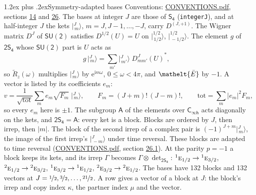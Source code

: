 \documentclass[10pt,a4paper]{article}
\makeatletter
\renewcommand\section{\@startsection{section}{1}{\z@}{-3ex plus -1ex minus -.2ex}%
  {1.2ex plus .2ex}{\normalfont\large\sffamily\bfseries\color{parttitle}}}
\numberwithin{equation}{section}
\newcommand{\eltfont}[1]{{\let\sigma\eltsigma\mathelt{#1}}}
\newcommand{\grp}[1]{\mathsf{#1}}
\newcommand{\irr}[1]{\text{\normalfont\scshape #1}}
\newcommand{\conjpair}[1]{{}^{#1}}
\newcommand{\elt}[1]{\eltfont{#1}}
\newcommand{\iunit}{\mathrm{i}}
\newcommand{\expe}{\mathrm{e}}
\newcommand{\irrJp}[2]{D^{(#1,#2)}}
\newcommand{\wignerD}[1]{D^{#1}}
\newcommand{\conj}[1]{{#1}^{*}}
\newcommand{\irrprod}{\otimes}
\newcommand{\mult}{\kappa}
\newcommand{\intx}{\mu}
\newcommand{\jm}[2]{\bigl\lvert{}^{#1}_{\,#2}\bigr\rangle}
\newcommand{\barred}[1]{\bar{#1}}
\newcommand{\lift}[1]{\tilde{#1}}
\makeatother
\begin{document}
\section{Symmetry-adapted bases}\label{s:bases}
Conventions: \href{../../CONVENTIONS.pdf}{CONVENTIONS.pdf}, sections \href{../../../rotation/CONVENTIONS.pdf\#conv.14}{14} and \href{../../CONVENTIONS.pdf\#conv.26}{26}.
\leavevmode\label{n:index.m}\label{n:vector.ket}The bases at integer $J$ are those of \href{../../../rotation/data/pdf/S4.pdf}{$\grp{S_{4}}$} (\texttt{integerJ}), and at half-integer $J$ the kets $\jm{J}{m}$, $m = J, J-1, \dots, -J$, carry $\irrJp{J}{+1}$. \label{n:matrix.wigner}The Wigner matrix $\wignerD{J}$ of $\grp{SU(2)}$ satisfies $\wignerD{1/2}(U) = U$ on $\jm{1/2}{1/2}$, $\jm{1/2}{-1/2}$. The element $g$ of $\grp{2S_{4}}$ whose $\grp{SU(2)}$ part is $U$ acts as
\begin{equation}\label{e:action}g\,\jm{J}{m} = \sum_{m'} \jm{J}{m'}\; \conj{\wignerD{J}_{m m'}(U)},\end{equation}
so $\lift{R}_{z}(\omega)$ multiplies $\jm{J}{m}$ by $\expe^{\iunit m\omega}$, $0 \le \omega < 4\pi$, and $\elt{\barred{E}}$ by $-1$. \label{n:index.ketcoefficient}\label{n:vector.basis.symmetry}\label{n:index.ketweight}\label{n:index.total}A vector is listed by its coefficients $e_m$:
\begin{equation}\label{e:ket}v = \frac{1}{\sqrt{\mathrm{tot}}}\sum_m e_m\sqrt{F_m}\;\jm{J}{m},\qquad F_m = (J+m)!\,(J-m)!,\qquad \mathrm{tot} = \sum_m |e_m|^2F_m,\end{equation}
so every $e_m$ here is $\pm 1$.
\leavevmode\label{n:group.A}The subgroup $\grp{A}$ of the elements over $\grp{C_{\infty h}}$ acts diagonally on the kets, and $\grp{2S_{4}} = \grp{A}$: every ket is a block. Blocks are ordered by $J$, then irrep, then $|m|$. The block of the second irrep of a complex pair is $(-1)^{J+m}\jm{J}{m}$, the image of the first irrep's $\jm{J}{-m}$ under time reversal. These blocks are adapted to time reversal (\href{../../CONVENTIONS.pdf}{CONVENTIONS.pdf}, section \href{../../CONVENTIONS.pdf\#conv.26.1}{26.1}).
At the parity $p = -1$ a block keeps its kets, and its irrep $\Gamma$ becomes $\Gamma \irrprod \det_{\grp{2S_{4}}}$: $\conjpair{1}\irr{e}_{1/2} \to \conjpair{1}\irr{e}_{3/2}$, $\conjpair{2}\irr{e}_{1/2} \to \conjpair{2}\irr{e}_{3/2}$, $\conjpair{1}\irr{e}_{3/2} \to \conjpair{1}\irr{e}_{1/2}$, $\conjpair{2}\irr{e}_{3/2} \to \conjpair{2}\irr{e}_{1/2}$.
The bases have 132 blocks and 132 vectors at $J = \nicefrac{1}{2}, \nicefrac{3}{2}, \dots, \nicefrac{21}{2}$. \label{n:index.copy}\label{n:head.vector}A row gives a vector of a block at $J$: the block's irrep and copy index $\mult$, the partner index $\intx$ and the vector.
\end{document}

